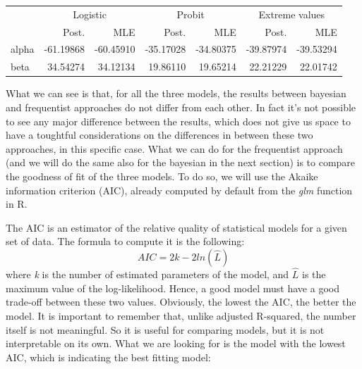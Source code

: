 \documentclass[]{article}
\newenvironment{Shaded}{\begin{snugshade}}{\end{snugshade}}
\newcommand{\DataTypeTok}[1]{\textcolor[rgb]{0.13,0.29,0.53}{#1}}
\newcommand{\DecValTok}[1]{\textcolor[rgb]{0.00,0.00,0.81}{#1}}
\newcommand{\KeywordTok}[1]{\textcolor[rgb]{0.13,0.29,0.53}{\textbf{#1}}}
\newcommand{\NormalTok}[1]{#1}
\newcommand{\OperatorTok}[1]{\textcolor[rgb]{0.81,0.36,0.00}{\textbf{#1}}}
\newcommand{\StringTok}[1]{\textcolor[rgb]{0.31,0.60,0.02}{#1}}
\begin{document}
\begin{Shaded}
\end{Shaded}

\begin{table}[!h]
\centering
\begin{tabular}{lrrrrrr}
\toprule
\multicolumn{1}{c}{ } & \multicolumn{2}{c}{Logistic} & \multicolumn{2}{c}{Probit} & \multicolumn{2}{c}{Extreme values} \\
\cmidrule(l{3pt}r{3pt}){2-3} \cmidrule(l{3pt}r{3pt}){4-5} \cmidrule(l{3pt}r{3pt}){6-7}
  & Post. & MLE & Post. & MLE & Post. & MLE\\
\midrule
\rowcolor{gray!6}  alpha & -61.19868 & -60.45910 & -35.17028 & -34.80375 & -39.87974 & -39.53294\\
beta & 34.54274 & 34.12134 & 19.86110 & 19.65214 & 22.21229 & 22.01742\\
\bottomrule
\end{tabular}
\end{table}

What we can see is that, for all the three models, the results between
bayesian and frequentist approaches do not differ from each other. In
fact it's not possible to see any major difference between the results,
which does not give us space to have a toughtful considerations on the
differences in between these two approaches, in this specific case. What
we can do for the frequentist approach (and we will do the same also for
the bayesian in the next section) is to compare the goodness of fit of
the three models. To do so, we will use the Akaike information criterion
(AIC), already computed by default from the \emph{glm} function in R.

The AIC is an estimator of the relative quality of statistical models
for a given set of data. The formula to compute it is the following:
\[ AIC = 2k -2ln(\hat{L})\] where \emph{k} is the number of estimated
parameters of the model, and \(\hat{L}\) is the maximum value of the
log-likelihood. Hence, a good model must have a good trade-off between
these two values. Obviously, the lowest the AIC, the better the model.
It is important to remember that, unlike adjusted R-squared, the number
itself is not meaningful. So it is useful for comparing models, but it
is not interpretable on its own. What we are looking for is the model
with the lowest AIC, which is indicating the best fitting model:
\end{document}

